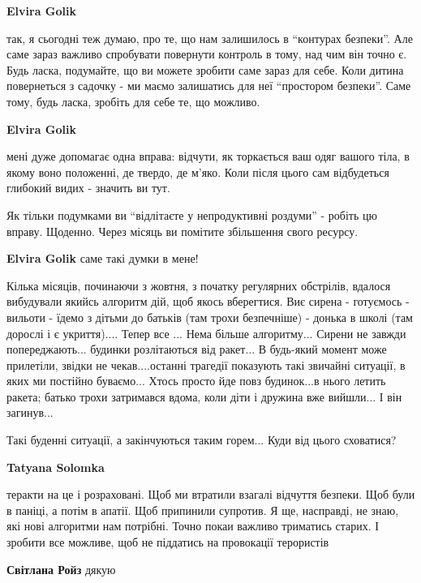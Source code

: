 \begin{itemize}
\begin{itemize} %
\textbf{Elvira Golik} 

так, я сьогодні теж думаю, про те, що нам залишилось в \enquote{контурах безпеки}. Але
саме зараз важливо спробувати повернути контроль в тому, над чим він точно є.
Будь ласка, подумайте, що ви можете зробити саме зараз для себе. Коли дитина
повернеться з садочку - ми маємо залишатись для неї \enquote{простором безпеки}. Саме
тому, будь ласка, зробіть для себе те, що можливо.

\textbf{Elvira Golik} 

мені дуже допомагає одна вправа: відчути, як торкається ваш одяг вашого тіла, в
якому воно положенні, де твердо, де м'яко. Коли після цього сам відбудеться
глибокий видих - значить ви тут.

Як тільки подумками ви \enquote{відлітаєте у непродуктивні роздуми} - робіть цю
вправу. Щоденно. Через місяць ви помітите збільшення свого ресурсу.

\textbf{Elvira Golik} саме такі думки в мене!
\end{itemize} %


Кілька місяців, починаючи з жовтня, з початку регулярних обстрілів, вдалося
вибудували якийсь алгоритм дій, щоб якось вберегтися. Виє сирена - готуємось -
вильоти - їдемо з дітьми до батьків (там трохи безпечніше) - донька в школі
(там дорослі і є укриття).... Тепер все ... Нема більше алгоритму... Сирени не
завжди попереджають... будинки розлітаються від ракет... В будь-який момент може
прилетіли, звідки не чекав....останні трагедії показують такі звичайні
ситуації, в яких ми постійно буваємо... Хтось просто йде повз будинок...в нього
летить ракета; батько трохи затримався вдома, коли діти і дружина вже вийшли...
І він загинув...

Такі буденні ситуації, а закінчуються таким горем... Куди від цього сховатися?

\begin{itemize} %
\textbf{Tatyana Solomka} 

теракти на це і розраховані. Щоб ми втратили взагалі відчуття безпеки. Щоб були
в паніці, а потім в апатії. Щоб припинили супротив. Я ще, насправді, не знаю,
які нові алгоритми нам потрібні. Точно покаи важливо триматись старих. І
зробити все можливе, щоб не піддатись на провокації терористів

\textbf{Світлана Ройз} дякую 🙏
\end{itemize} %


\end{itemize}
